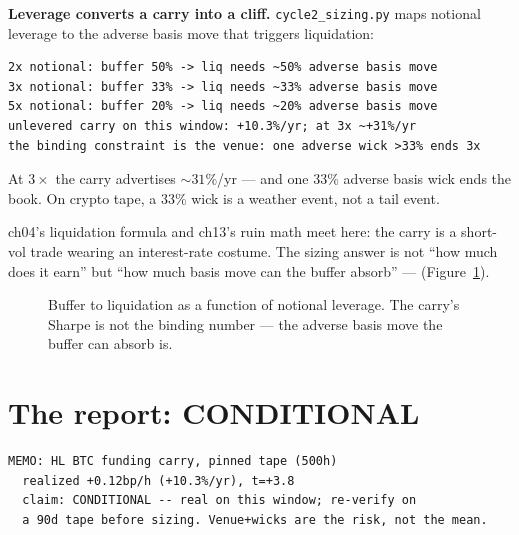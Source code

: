 \begin{example}\label{ex:liq18}
\textbf{Leverage converts a carry into a cliff.}
\texttt{cycle2\_sizing.py} maps notional leverage to the
adverse basis move that triggers liquidation:
\begin{verbatim}
2x notional: buffer 50% -> liq needs ~50% adverse basis move
3x notional: buffer 33% -> liq needs ~33% adverse basis move
5x notional: buffer 20% -> liq needs ~20% adverse basis move
unlevered carry on this window: +10.3%/yr; at 3x ~+31%/yr
the binding constraint is the venue: one adverse wick >33% ends 3x
\end{verbatim}
At $3\times$ the carry advertises $\sim31\%$/yr --- and one
$33\%$ adverse basis wick ends the book. On crypto tape, a
$33\%$ wick is a weather event, not a tail event.
\begin{solution}
ch04's liquidation formula and ch13's ruin math meet here:
the carry is a short-vol trade wearing an interest-rate
costume. The sizing answer is not ``how much does it earn''
but ``how much basis move can the buffer absorb'' ---
(Figure~\ref{fig:liqmap}).
\end{solution}
\end{example}

\begin{figure}[htbp]\centering

\caption{Buffer to liquidation as a function of notional
leverage. The carry's Sharpe is not the binding number ---
the adverse basis move the buffer can absorb is.}
\label{fig:liqmap}
\end{figure}

\section{The report: CONDITIONAL}\label{sec:report18}

\begin{verbatim}
MEMO: HL BTC funding carry, pinned tape (500h)
  realized +0.12bp/h (+10.3%/yr), t=+3.8
  claim: CONDITIONAL -- real on this window; re-verify on
  a 90d tape before sizing. Venue+wicks are the risk, not the mean.
\end{verbatim}


